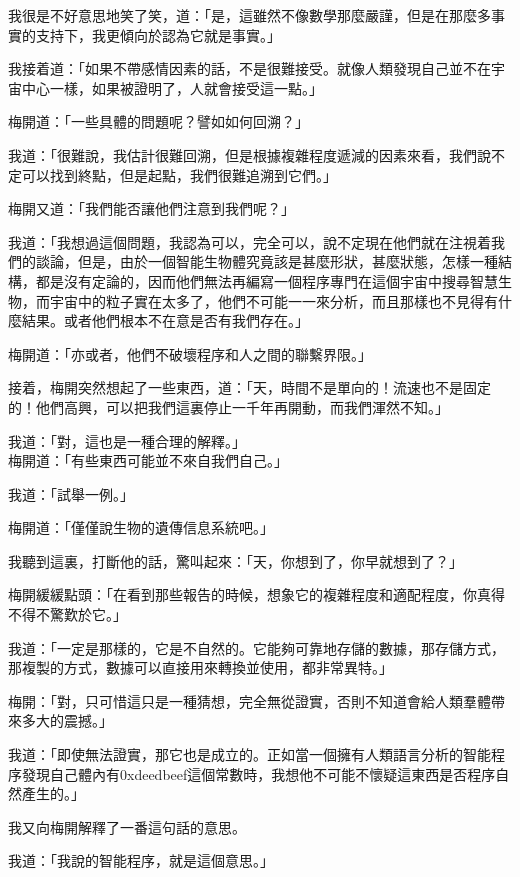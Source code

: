 我很是不好意思地笑了笑，道：「是，這雖然不像數學那麼嚴謹，但是在那麼多事實的支持下，我更傾向於認為它就是事實。」

我接着道：「如果不帶感情因素的話，不是很難接受。就像人類發現自己並不在宇宙中心一樣，如果被證明了，人就會接受這一點。」

梅開道：「一些具體的問題呢？譬如如何回溯？」

我道：「很難說，我估計很難回溯，但是根據複雜程度遞減的因素來看，我們說不定可以找到終點，但是起點，我們很難追溯到它們。」

梅開又道：「我們能否讓他們注意到我們呢？」

我道：「我想過這個問題，我認為可以，完全可以，說不定現在他們就在注視着我們的談論，但是，由於一個智能生物體究竟該是甚麼形狀，甚麼狀態，怎樣一種結構，都是沒有定論的，因而他們無法再編寫一個程序專門在這個宇宙中搜尋智慧生物，而宇宙中的粒子實在太多了，他們不可能一一來分析，而且那樣也不見得有什麼結果。或者他們根本不在意是否有我們存在。」

梅開道：「亦或者，他們不破壞程序和人之間的聯繫界限。」

接着，梅開突然想起了一些東西，道：「天，時間不是單向的！流速也不是固定的！他們高興，可以把我們這裏停止一千年再開動，而我們渾然不知。」

我道：「對，這也是一種合理的解釋。」
\\


梅開道：「有些東西可能並不來自我們自己。」

我道：「試舉一例。」

梅開道：「僅僅說生物的遺傳信息系統吧。」

我聽到這裏，打斷他的話，驚叫起來：「天，你想到了，你早就想到了？」

梅開緩緩點頭：「在看到那些報告的時候，想象它的複雜程度和適配程度，你真得不得不驚歎於它。」

我道：「一定是那樣的，它是不自然的。它能夠可靠地存儲的數據，那存儲方式，那複製的方式，數據可以直接用來轉換並使用，都非常異特。」

梅開：「對，只可惜這只是一種猜想，完全無從證實，否則不知道會給人類羣體帶來多大的震撼。」

我道：「即使無法證實，那它也是成立的。正如當一個擁有人類語言分析的智能程序發現自己體內有0xdeedbeef這個常數時，我想他不可能不懷疑這東西是否程序自然產生的。」


我又向梅開解釋了一番這句話的意思。

我道：「我說的智能程序，就是這個意思。」


